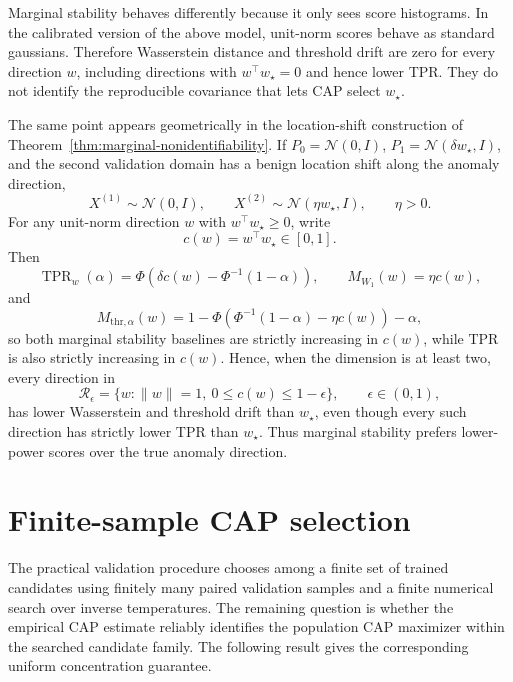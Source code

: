 \documentclass[11pt]{article}
\newcommand{\Normal}{\mathcal{N}}
\newcommand{\TPR}{\operatorname{TPR}}
\begin{document}
Marginal stability behaves differently because it only sees score histograms. In
the calibrated version of the above model, unit-norm scores behave as standard gaussians.
Therefore Wasserstein distance and threshold drift are zero for every
direction \(w\), including directions with \(w^\top w_\star=0\) and hence lower
TPR. They do not identify the reproducible covariance that lets CAP select
\(w_\star\).

The same point appears geometrically in the location-shift construction of
Theorem~\ref{thm:marginal-nonidentifiability}. If
\(P_0=\Normal(0,I)\), \(P_1=\Normal(\delta w_\star,I)\), and the second
validation domain has a benign location shift along the anomaly direction,
\[
    X^{(1)}\sim\Normal(0,I),
    \qquad
    X^{(2)}\sim\Normal(\eta w_\star,I),
    \qquad
    \eta>0.
\]
For any unit-norm direction \(w\) with \(w^\top w_\star\ge0\), write
\[
    c(w)=w^\top w_\star\in[0,1].
\]
Then
\[
    \TPR_w(\alpha)
    =
    \Phi\!\left(\delta c(w)-\Phi^{-1}(1-\alpha)\right),
    \qquad
    M_{W_1}(w)=\eta c(w),
\]
and
\[
    M_{\mathrm{thr},\alpha}(w)
    =
    1-\Phi\!\left(\Phi^{-1}(1-\alpha)-\eta c(w)\right)-\alpha,
\]
so both marginal stability baselines are strictly increasing in \(c(w)\), while
TPR is also strictly increasing in \(c(w)\). Hence, when the dimension is at
least two, every direction in
\[
    \mathcal R_\epsilon
    =
    \{w:\|w\|=1,\ 0\le c(w)\le 1-\epsilon\},
    \qquad
    \epsilon\in(0,1),
\]
has lower Wasserstein and threshold drift than \(w_\star\), even though every
such direction has strictly lower TPR than \(w_\star\). Thus marginal stability
prefers lower-power scores over the true anomaly direction.

\section{Finite-sample CAP selection}

The practical validation procedure chooses among a finite set of trained candidates
using finitely many paired validation samples and a finite numerical search over
inverse temperatures. The remaining question is whether the empirical CAP estimate reliably identifies the
population CAP maximizer within the searched candidate family. The following
result gives the corresponding uniform concentration guarantee.
\end{document}

